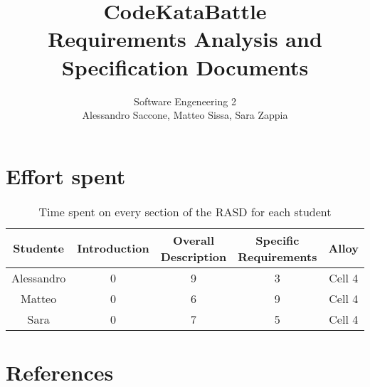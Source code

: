 \documentclass[12pt,a4paper]{article}
\title{CodeKataBattle\\ Requirements Analysis and Specification Documents}
\author{Software Engeneering 2\\
       Alessandro Saccone, Matteo Sissa, Sara Zappia}
\begin{document}
\maketitle

\newpage









\section{Effort spent}
\begin{table}[h]
  \centering
  \begin{tabular}{|c|c|c|c|c|}
    \hline
     Studente & Introduction & Overall Description & Specific Requirements & Alloy \\
    \hline
    Alessandro & 0 & 9 & 3 & Cell 4 \\
    \hline
    Matteo & 0 & 6 & 9 & Cell 4 \\
    \hline
    Sara & 0 & 7 & 5 & Cell 4 \\
    \hline
  \end{tabular}
  \caption{Time spent on every section of the RASD for each student}
  \label{tab:effort}
\end{table}

\section{References}


\end{document}
